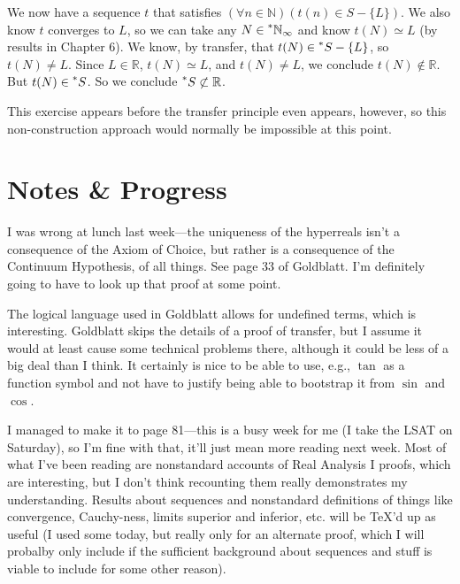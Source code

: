 \documentclass{article}
\newcommand{\reals}{\mathbb{R}}
\newcommand{\nats}{\mathbb{N}}
\newcommand{\hnats}{\prescript{*}{}{\mathbb{N}}}
\newcommand{\hr}[1]{\prescript{*}{}{#1}}
\begin{document}
We now have a sequence $t$ that satisfies $(\forall n \in \nats)(t(n) \in S - \{L\})$. We also know $t$ converges to $L$, so we can take any $N \in \hnats_\infty$ and know $t(N) \simeq L$ (by results in Chapter 6). We know, by transfer, that $t(N) \in \hr{S} - \{L\}$, so $t(N) \neq L$. Since $L\in \reals$, $t(N) \simeq L$, and $t(N) \neq L$, we conclude $t(N) \notin \reals$. But $t(N) \in \hr{S}$. So we conclude $\hr{S} \not\subset\reals$.

This exercise appears before the transfer principle even appears, however, so this non-construction approach would normally be impossible at this point.


\section*{Notes \& Progress}

I was wrong at lunch last week---the uniqueness of the hyperreals isn't a consequence of the Axiom of Choice, but rather is a consequence of the Continuum Hypothesis, of all things. See page 33 of Goldblatt. I'm definitely going to have to look up that proof at some point.

The logical language used in Goldblatt allows for undefined terms, which is interesting. Goldblatt skips the details of a proof of transfer, but I assume it would at least cause some technical problems there, although it could be less of a big deal than I think. It certainly is nice to be able to use, e.g., $\tan$ as a function symbol and not have to justify being able to bootstrap it from $\sin$ and $\cos$.

I managed to make it to page 81---this is a busy week for me (I take the LSAT on Saturday), so I'm fine with that, it'll just mean more reading next week. Most of what I've been reading are nonstandard accounts of Real Analysis I proofs, which are interesting, but I don't think recounting them really demonstrates my understanding. Results about sequences and nonstandard definitions of things like convergence, Cauchy-ness, limits superior and inferior, etc. will be TeX'd up as useful (I used some today, but really only for an alternate proof, which I will probalby only include if the sufficient background about sequences and stuff is viable to include for some other reason).
\end{document}

